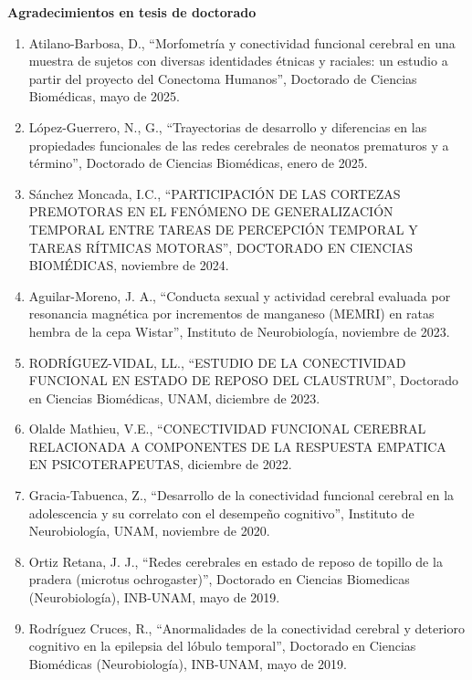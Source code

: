 {\large \textbf{Agradecimientos en tesis de doctorado}}

\hrulefill

\begin{enumerate}

\item Atilano-Barbosa, D., “Morfometría y conectividad funcional cerebral en una muestra de sujetos con diversas identidades étnicas 
y raciales: un 
estudio a partir del proyecto del Conectoma Humanos”, Doctorado de Ciencias Biomédicas, mayo de 2025.

\item López-Guerrero, N., G., “Trayectorias de desarrollo y diferencias en las propiedades funcionales de las redes cerebrales de neonatos 
prematuros y a término”, Doctorado de Ciencias Biomédicas, enero de 2025.

\item Sánchez Moncada, I.C., “PARTICIPACIÓN DE LAS CORTEZAS PREMOTORAS EN EL FENÓMENO DE GENERALIZACIÓN TEMPORAL ENTRE TAREAS DE PERCEPCIÓN 
TEMPORAL Y TAREAS RÍTMICAS MOTORAS”, DOCTORADO EN CIENCIAS BIOMÉDICAS, noviembre de 2024.

\item Aguilar-Moreno, J. A., “Conducta sexual y actividad cerebral evaluada por resonancia magnética por incrementos de manganeso (MEMRI) en 
ratas 
hembra de la cepa Wistar”, Instituto de Neurobiología, noviembre de 2023.

\item RODRÍGUEZ-VIDAL, LL., “ESTUDIO DE LA CONECTIVIDAD FUNCIONAL EN ESTADO DE REPOSO DEL CLAUSTRUM”, Doctorado en Ciencias Biomédicas, UNAM, 
diciembre de 2023.

\item Olalde Mathieu, V.E., “CONECTIVIDAD FUNCIONAL CEREBRAL RELACIONADA A COMPONENTES DE LA RESPUESTA EMPATICA EN PSICOTERAPEUTAS, diciembre 
de 
2022.

\item Gracia-Tabuenca, Z., “Desarrollo de la conectividad funcional cerebral en la adolescencia y su correlato con el desempeño cognitivo”, 
Instituto de Neurobiología, UNAM, noviembre de 2020.

\item Ortiz Retana, J. J., “Redes cerebrales en estado de reposo de topillo de la pradera (microtus ochrogaster)”, Doctorado en Ciencias 
Biomedicas 
(Neurobiología), INB-UNAM, mayo de 2019.

\item Rodríguez Cruces, R., “Anormalidades de la conectividad cerebral y deterioro cognitivo en la epilepsia del lóbulo temporal”, Doctorado 
en 
Ciencias Biomédicas (Neurobiología), INB-UNAM, mayo de 2019.


\end{enumerate}
